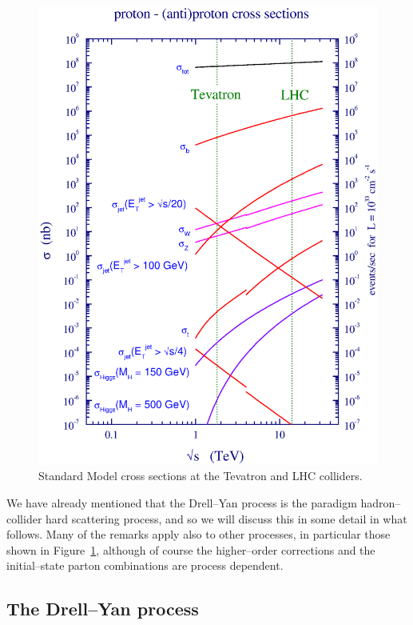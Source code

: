 \documentclass[12pt]{iopart}
\begin{document}
\begin{figure}[t]                                                               
\begin{center}
\includegraphics[width=12cm]{lhcolor.ps}
\end{center}
\vspace*{-1cm}
\caption{Standard Model cross sections at the Tevatron
and LHC colliders.\label{fig:lhcall}}                    
\end{figure}    

We have already mentioned that the Drell--Yan process is the paradigm
hadron--collider hard scattering process, and so we will discuss this in
some detail in what follows. Many of the remarks apply also
to other processes, in particular those shown in Figure~\ref{fig:lhcall},
although of course the higher--order corrections and the initial--state
parton combinations are process dependent.

\subsection{The Drell--Yan process}
\label{sec:DY}
\end{document}
